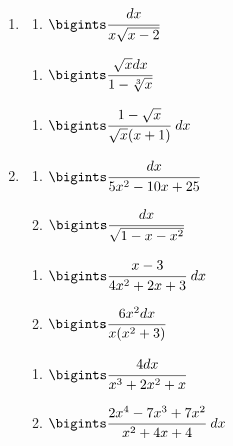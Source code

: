 \documentclass{article}
\begin{document}
\begin{multicols}{2}
\begin{enumerate}[label=\Roman*.]
		\item
		\begin{multicols}{3}
			\begin{enumerate}[label=\arabic*.]
				\setlength\itemsep{1em}
				\item $\bigints\cfrac{dx}{x\sqrt{x - 2}}$
			\end{enumerate}
			\vfill\null\columnbreak
			\begin{enumerate}[label=\arabic*., start=2]
				\setlength\itemsep{1em}
				\item $\bigints\cfrac{\sqrt{x}dx}{1 - \sqrt[3]{x}}$
			\end{enumerate}
			\vfill\null\columnbreak
			\begin{enumerate}[label=\arabic*., start=3]
				\setlength\itemsep{1em}
				\item $\bigints\cfrac{1 - \sqrt{x}}{\sqrt{x} (x + 1)}\ dx$
			\end{enumerate}
			\vfill\null\columnbreak
		\end{multicols}
		
		\item
		\begin{multicols}{3}
			\begin{enumerate}[label=\arabic*.]
				\setlength\itemsep{1em}
				\item $\bigints\cfrac{dx}{5x^2 - 10x + 25}$
				\item $\bigints\cfrac{dx}{\sqrt{1 - x - x^2}}$
			\end{enumerate}
			\vfill\null\columnbreak
			\begin{enumerate}[label=\arabic*., start=3]
				\setlength\itemsep{1em}
				\item $\bigints\cfrac{x-3}{4x^2+2x+3}\ dx$
				\item $\bigints\cfrac{6x^2dx}{x(x^2+3)}$
			\end{enumerate}
			\vfill\null\columnbreak
			\begin{enumerate}[label=\arabic*., start=5]
				\setlength\itemsep{1em}
				\item $\bigints\cfrac{4dx}{x^3 + 2x^2 + x}$
				\item $\bigints\cfrac{2x^4-7x^3+7x^2}{x^2 + 4x + 4}\ dx$
			\end{enumerate}
			\vfill\null\columnbreak
		\end{multicols}
		

\end{enumerate}
\end{multicols}
\end{document}
